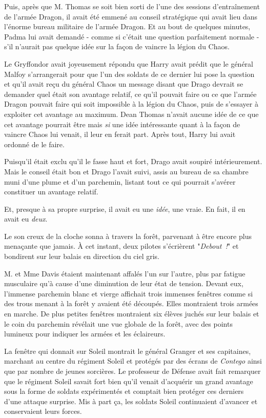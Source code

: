 Puis, après que M. Thomas se soit bien sorti de l'une des sessions d'entraînement de l'armée Dragon, il avait été emmené au conseil stratégique qui avait lieu dans l'énorme bureau militaire de l'armée Dragon. Et au bout de quelques minutes, Padma lui avait demandé - comme si c'était une question parfaitement normale - s'il n'aurait pas quelque idée sur la façon de vaincre la légion du Chaos.

Le Gryffondor avait joyeusement répondu que Harry avait prédit que le général Malfoy s'arrangerait pour que l'un des soldats de ce dernier lui pose la question et qu'il avait reçu du général Chaos un message disant que Drago devrait se demander quel était son avantage relatif, ce qu'il pouvait faire ou ce que l'armée Dragon pouvait faire qui soit impossible à la légion du Chaos, puis de s'essayer à exploiter cet avantage au maximum. Dean Thomas n'avait aucune idée de ce que cet avantage pourrait être mais \emph{si} une idée intéressante quant à la façon de vaincre Chaos lui venait, il leur en ferait part. Après tout, Harry lui avait ordonné de le faire.

Puisqu'il était exclu qu'il le fasse haut et fort, Drago avait soupiré intérieurement. Mais le conseil était bon et Drago l'avait suivi, assis au bureau de sa chambre muni d'une plume et d'un parchemin, listant tout ce qui pourrait s'avérer constituer un avantage relatif.

Et, presque à sa propre surprise, il avait eu une \emph{idée}, une vraie. En fait, il en avait eu \emph{deux}.

Le son creux de la cloche sonna à travers la forêt, parvenant à être encore plus menaçante que jamais. À cet instant, deux pilotes s'écrièrent "\emph{Debout~!}" et bondirent sur leur balais en direction du ciel gris.

\later

M. et Mme Davis étaient maintenant affalés l'un sur l'autre, plus par fatigue musculaire qu'à cause d'une diminution de leur état de tension. Devant eux, l'immense parchemin blanc et vierge affichait trois immenses fenêtres comme si des trous menant à la forêt y avaient été découpés. Elles montraient trois armées en marche. De plus petites fenêtres montraient six élèves juchés sur leur balais et le coin du parchemin révélait une vue globale de la forêt, avec des points lumineux pour indiquer les armées et les éclaireurs.

La fenêtre qui donnait sur Soleil montrait le général Granger et ses capitaines, marchant au centre du régiment Soleil et protégés par des écrans de \emph{Contego} ainsi que par nombre de jeunes sorcières. Le professeur de Défense avait fait remarquer que le régiment Soleil savait fort bien qu'il venait d'acquérir un grand avantage sous la forme de soldats expérimentés et comptait bien protéger ces derniers d'une attaque surprise. Mis à part ça, les soldats Soleil continuaient d'avancer et conservaient leurs forces.

